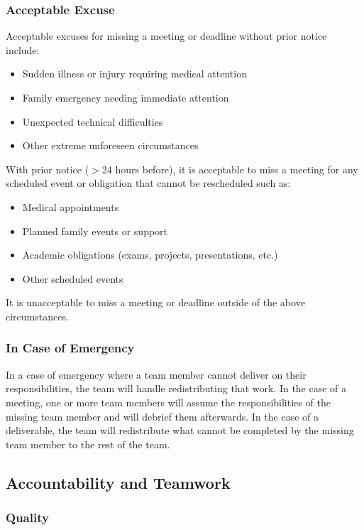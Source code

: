 \documentclass{article}
\begin{document}
\subsubsection*{Acceptable Excuse}

\noindent Acceptable excuses for missing a meeting or deadline without prior notice include:
\begin{itemize}
  \item Sudden illness or injury requiring medical attention
  \item Family emergency needing immediate attention
  \item Unexpected technical difficulties
  \item Other extreme unforeseen circumstances
\end{itemize}

\noindent With prior notice ($>$24 hours before), it is acceptable to miss a meeting for any scheduled event or obligation that cannot be rescheduled such as:
\begin{itemize}
  \item Medical appointments
  \item Planned family events or support
  \item Academic obligations (exams, projects, presentations, etc.)
  \item Other scheduled events
\end{itemize}

\noindent It is unacceptable to miss a meeting or deadline outside of the above circumstances.

\subsubsection*{In Case of Emergency}

In a case of emergency where a team member cannot deliver on their responsibilities, the team will handle redistributing that work.
In the case of a meeting, one or more team members will assume the responsibilities of the missing team member and will debrief them afterwards.
In the case of a deliverable, the team will redistribute what cannot be completed by the missing team member to the rest of the team.

\subsection*{Accountability and Teamwork}

\subsubsection*{Quality} 
\end{document}
